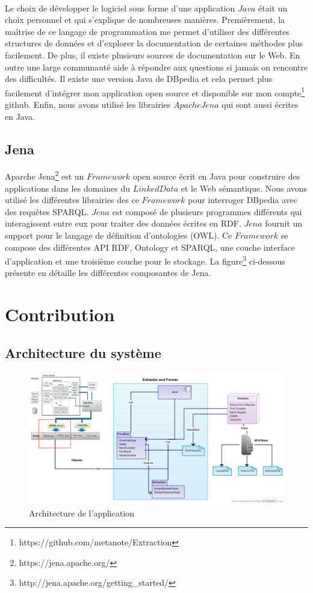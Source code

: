 \paragraph{}
Le choix de développer le logiciel sous forme d'une application $Java$ était un choix personnel et qui s'explique de nombreuses manières. Premièrement, la maîtrise de ce langage de programmation me permet d'utiliser des différentes structures de données et d'explorer la documentation de certaines méthodes plus facilement. De plus, il existe plusieurs sources de documentation sur le Web. En outre une large communauté aide à répondre aux questions si jamais on rencontre des difficultés. Il existe une version Java de DBpedia et cela permet plus facilement d'intégrer mon application open source et disponible sur mon compte\footnote{https://github.com/metanote/Extraction} github. Enfin, nous avons utilisé les librairies $ApacheJena$ qui sont aussi écrites en Java. 
\subsection{Jena}
Aparche Jena\footnote{https://jena.apache.org/} est un $Framework$ open source écrit en Java pour construire des applications dans les domaines du
$LinkedData$ et le Web sémantique. Nous avons utilisé les différentes librairies des ce $Framework$ pour interroger DBpedia avec des requêtes SPARQL. $Jena$ est composé de plusieurs programmes différents qui interagissent entre eux pour traiter des données écrites en RDF. $Jena$ fournit un support pour le langage de définition d'ontologies (OWL). Ce $Framework$ se compose des différentes API RDF, Ontology et SPARQL, une couche interface d'application et une troisième couche pour le stockage. La figure\footnote{http://jena.apache.org/getting\_started/} ci-dessous présente en détaille les différentes composantes de Jena.
\section{Contribution}
\subsection{Architecture du système}
 \begin{figure}[H]
        \centering
                \includegraphics[width=16cm]{NEWArchitecture.png}
               \caption{Architecture de l'application}
\end{figure}
